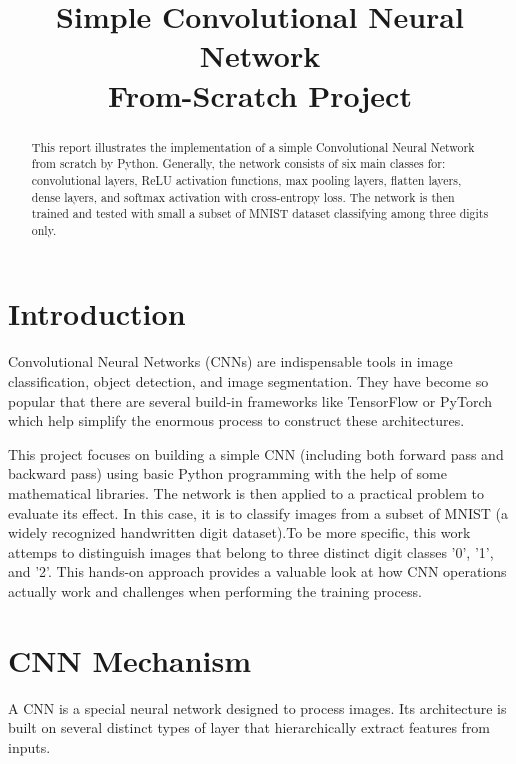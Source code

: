 \documentclass[conference]{IEEEtran}
\begin{document}
\title{Simple Convolutional Neural Network \\
From-Scratch Project}


\author{
}

\maketitle

\begin{abstract}
This report illustrates the implementation of a simple Convolutional Neural Network from scratch by Python. Generally, the network consists of six main classes for: convolutional layers, ReLU activation functions, max pooling layers, flatten layers, dense layers, and softmax activation with cross-entropy loss. The network is then trained and tested with small a subset of MNIST dataset classifying among three digits only.
\end{abstract}

\IEEEpeerreviewmaketitle

\section{Introduction}
Convolutional Neural Networks (CNNs) are indispensable tools in image classification, object detection, and image segmentation. They have become so popular that there are several build-in frameworks like TensorFlow or PyTorch which help simplify the enormous process to construct these architectures. 

This project focuses on building a simple CNN (including both forward pass and backward pass) using basic Python programming with the help of some mathematical libraries. The network is then applied to a practical problem to evaluate its effect. In this case, it is to classify images from a subset of MNIST (a widely recognized handwritten digit dataset).To be more specific, this work attemps to distinguish images that belong to three distinct digit classes '0', '1', and '2'. This hands-on approach provides a valuable look at how CNN operations actually work and challenges when performing the training process.

\section{CNN Mechanism}
A CNN is a special neural network designed to process images. Its architecture is built on several distinct types of layer that hierarchically extract features from inputs.
\end{document}
